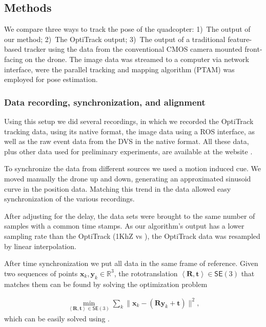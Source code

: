 \subsection{Methods}

We compare three ways to track the pose of the quadcopter: 1)~The
output of our method; 2)~The OptiTrack output; 3)~The output of
a traditional feature-based tracker using the data from the conventional
CMOS camera mounted front-facing on the drone. The image data was
streamed to a computer via network interface, were the parallel tracking
and mapping algorithm (PTAM)\cite{PTAM} was employed for pose estimation.


\subsubsection{Data recording, synchronization, and alignment\label{sec:datarecording}}

Using this setup we did several recordings, in which we recorded the
OptiTrack tracking data, using its native format, the image data using
a ROS interface, as well as the raw event data from the DVS in the
native format. All these data, plus other data used for preliminary
experiments, are available at the website \xxx.

To synchronize the data from different sources we used a motion induced
cue. We moved manually the drone up and down, generating an approximated
sinusoid curve in the position data. Matching this trend in the data
allowed easy synchronization of the various recordings.

After adjusting for the delay, the data sets were brought to the same
number of samples with a common time stamps. As our algorithm's output
has a lower sampling rate than the OptiTrack (1KhZ vs \xxx), the
OptiTrack data was resampled by linear interpolation.



After time synchronization we put all data in the same frame of reference.
Given two sequences of points $\boldsymbol{x}_{k},\boldsymbol{y}_{k}\in\mathbb{R}^{3}$,
the rototranslation $\left\langle \boldsymbol{R},\boldsymbol{t}\right\rangle \in\mathsf{SE}(3)$
that matches them can be found by solving the optimization problem

\begin{equation}
\begin{aligned}\min_{\left\langle \boldsymbol{R},\boldsymbol{t}\right\rangle \in\mathsf{SE}(3)}\sum_{k}\|\boldsymbol{x}_{k}-(\boldsymbol{R}\boldsymbol{y}_{k}+\boldsymbol{t})\|^{2},\end{aligned}
\label{eq:leastsquares}
\end{equation}
which can be easily solved using \xxx.




